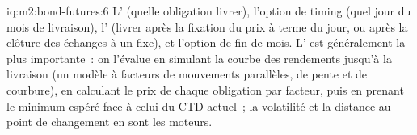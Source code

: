 \begin{solution}{iq:m2:bond-futures:6}
L' (quelle obligation livrer), l'option de timing (quel jour du mois de livraison),
l' (livrer après la fixation du prix à terme du jour, ou après la clôture des échanges à un  fixe),
et l'option de fin de mois. L' est généralement la plus importante~: on l'évalue en simulant la
courbe des rendements jusqu'à la livraison (un modèle à facteurs de mouvements parallèles, de pente et de courbure),
en calculant le prix de chaque obligation par facteur, puis en prenant le minimum espéré
face à celui du CTD actuel~; la volatilité et la distance au point de changement
en sont les moteurs.
\end{solution}
